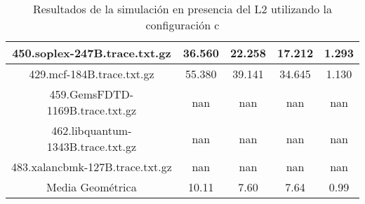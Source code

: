 \begin{table}[H]
\begin{tabular}{|c|c|c|c|c|}
450.soplex-247B.trace.txt.gz & 36.560 & 22.258 &  17.212 & 1.293\\\hline
429.mcf-184B.trace.txt.gz & 55.380 & 39.141 &  34.645 & 1.130\\\hline
459.GemsFDTD-1169B.trace.txt.gz & nan & nan &  nan & nan\\\hline
462.libquantum-1343B.trace.txt.gz & nan & nan &  nan & nan\\\hline
483.xalancbmk-127B.trace.txt.gz & nan & nan &  nan & nan\\\hline
Media Geométrica & 10.11 & 7.60& 7.64 & 0.99\\\hline
\end{tabular}
\caption{Resultados de la simulación en presencia del L2 utilizando la configuración c}
\label{tab:amatL3c}
\end{table}